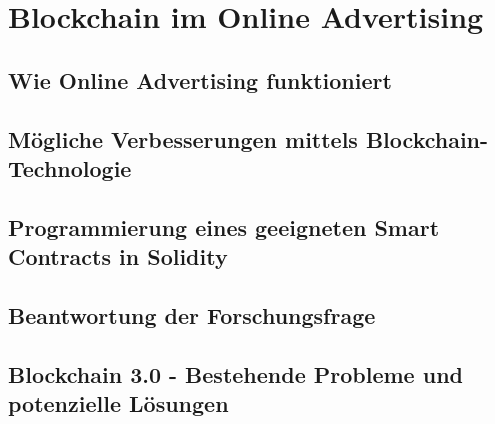 \chapter{Blockchain im Online Advertising}
\section{Wie Online Advertising funktioniert}
\section{Mögliche Verbesserungen mittels Blockchain-Technologie}
\section{Programmierung eines geeigneten Smart Contracts in Solidity}
\section{Beantwortung der Forschungsfrage}
\section{Blockchain 3.0 - Bestehende Probleme und potenzielle Lösungen}